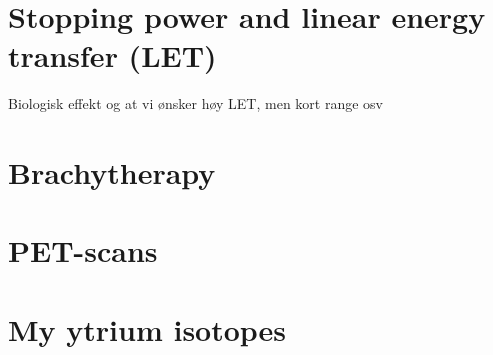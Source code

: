\section{Stopping power and linear energy transfer (LET)}
Biologisk effekt og at vi ønsker høy LET, men kort range osv

\section{Brachytherapy}
\section{PET-scans}
\section{My ytrium isotopes}


